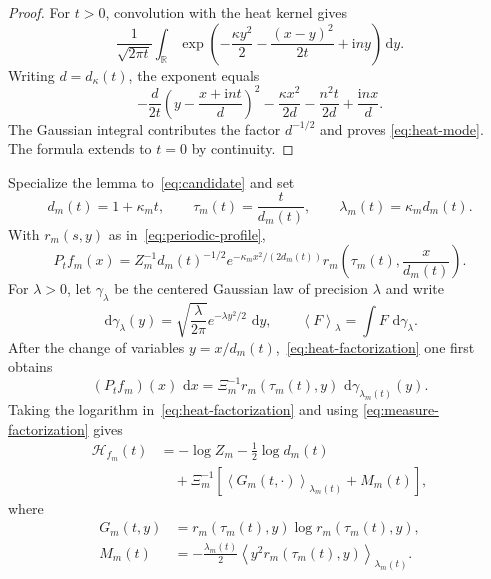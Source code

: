 \documentclass[10pt,letterpaper,journal]{IEEEtran}
\newcommand{\R}{\mathbb{R}}
\newcommand{\cH}{\mathcal{H}}
\newcommand{\dd}{\,\mathrm{d}}
\newcommand{\ii}{\mathrm{i}}
\newcommand{\avgG}[2]{\left\langle #1\right\rangle_{#2}}
\theoremstyle{plain}
\theoremstyle{definition}
\begin{document}
\begin{proof}
For $t>0$, convolution with the heat kernel gives
\[
 \frac1{\sqrt{2\pi t}}\int_{\R}
 \exp\!\left(-\frac{\kappa y^2}{2}-\frac{(x-y)^2}{2t}+\ii ny\right)\dd y.
\]
Writing $d=d_\kappa(t)$, the exponent equals
\[
 -\frac{d}{2t}\left(y-\frac{x+\ii nt}{d}\right)^2
 -\frac{\kappa x^2}{2d}-\frac{n^2t}{2d}+\frac{\ii nx}{d}.
\]
The Gaussian integral contributes the factor $d^{-1/2}$ and proves
\eqref{eq:heat-mode}. The formula extends to $t=0$ by continuity.
\end{proof}

Specialize the lemma to~\eqref{eq:candidate} and set
\begin{equation}
 d_m(t)=1+\kappa_mt,\qquad
 \tau_m(t)=\frac{t}{d_m(t)},\qquad
 \lambda_m(t)=\kappa_md_m(t).
 \label{eq:time-functions}
\end{equation}
With $r_m(s,y)$ as in~\eqref{eq:periodic-profile},
\begin{equation}
 P_tf_m(x)=Z_m^{-1}d_m(t)^{-1/2}
 e^{-\kappa_mx^2/(2d_m(t))}
 r_m\!\left(\tau_m(t),\frac{x}{d_m(t)}\right).
 \label{eq:heat-factorization}
\end{equation}
For $\lambda>0$, let $\gamma_\lambda$ be the centered Gaussian law of
precision $\lambda$ and write
\[
 \dd\gamma_\lambda(y)=\sqrt{\frac{\lambda}{2\pi}}
 e^{-\lambda y^2/2}\,\dd y,
 \qquad
 \avgG{F}{\lambda}=\int F\,\dd\gamma_\lambda.
\]
After the change of variables $y=x/d_m(t)$,~\eqref{eq:heat-factorization}
one first obtains
\begin{equation}
 (P_tf_m)(x)\,\dd x
 =\Xi_m^{-1}r_m(\tau_m(t),y)\,\dd\gamma_{\lambda_m(t)}(y).
 \label{eq:measure-factorization}
\end{equation}
Taking the logarithm in~\eqref{eq:heat-factorization} and using
\eqref{eq:measure-factorization} gives
\begin{equation}
 \begin{aligned}
 \cH_{f_m}(t)
 &=-\log Z_m-\frac12\log d_m(t)\\
 &\quad+\Xi_m^{-1}\left[
 \avgG{G_m(t,\cdot)}{\lambda_m(t)}+M_m(t)
 \right],
 \end{aligned}
 \label{eq:entropy-decomposition}
\end{equation}
where
\begin{equation}
 \begin{aligned}
 G_m(t,y)&=r_m(\tau_m(t),y)\log r_m(\tau_m(t),y),\\
 M_m(t)&=-\frac{\lambda_m(t)}2
 \avgG{y^2r_m(\tau_m(t),y)}{\lambda_m(t)}.
 \end{aligned}
 \label{eq:G-and-M}
\end{equation}
\end{document}
